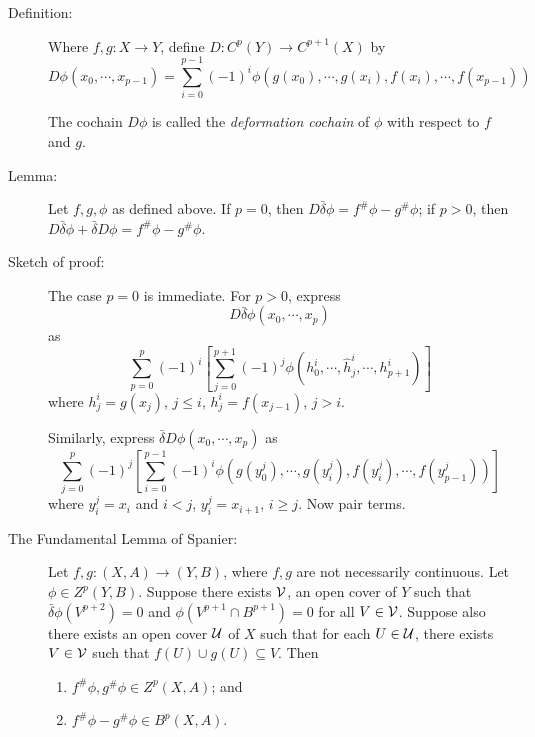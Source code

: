 \documentclass{article}
\begin{document}
\begin{description}
\item[Definition:] Where $f,g: X \longrightarrow Y$, define $D: C^p(Y) \longrightarrow C^{p+1}(X)$ by
  \begin{equation*}
  D \phi (x_0,\cdots,x_{p-1}) = \sum_{i=0}^{p-1} (-1)^i \phi ( g(x_0),\cdots,g(x_i),f(x_i),\cdots,f(x_{p-1}))
  \end{equation*}

  The cochain $D\phi$ is called the \emph{deformation cochain} of $\phi$ with respect to $f$ and $g$.

\item[Lemma:] Let $f,g,\phi$ as defined above. If $p=0$, then $D \bar{\delta} \phi = f^{\#} \phi - g^{\#} \phi$; if $p>0$, then $D \bar{\delta} \phi + \bar{\delta} D \phi = f^{\#} \phi - g^{\#} \phi$.

\item[Sketch of proof:] The case $p=0$ is immediate. For $p>0$, express 
  \begin{equation*}
  D \bar{\delta} \phi(x_0,\cdots,x_p)
  \end{equation*}
  as
  \begin{equation*}
  \sum_{p=0}^p(-1)^i \left[ \sum_{j=0}^{p+1}(-1)^j \phi (h_0^i,\cdots,\hat{h}_j^i,\cdots,h_{p+1}^i) \right]
  \end{equation*}
  where $h_j^i= g(x_j)$, $j \leq i$, $h_j^i=f(x_{j-1})$, $j>i$. 

  Similarly, express $\bar{\delta} D\phi (x_0,\cdots,x_p)$ as
  \begin{equation*}
  \sum_{j=0}^p(-1)^j \left[ \sum_{i=0}^{p-1}(-1)^i \phi (g(y_0^j),\cdots,g(y_i^j),f(y_i^j),\cdots,f(y_{p-1}^j)) \right]
  \end{equation*}
  where $y_i^j=x_i$ and $i<j$, $y_i^j=x_{i+1}$, $i \geq j$. Now pair terms.

\item[The Fundamental Lemma of Spanier:] Let $f,g: (X,A) \longrightarrow (Y,B)$, where $f,g$ are not necessarily continuous. Let $\phi \in Z^p(Y,B)$. Suppose there exists ${\cal V}$, an open cover of $Y$ such that $\bar{\delta} \phi (V^{p+2}) = 0$ and $\phi(V^{p+1} \cap B^{p+1}) = 0$ for all $V \in {\cal V}$. Suppose also there exists an open cover ${\cal U}$ of $X$ such that for each $U \in {\cal U}$, there exists $V \in {\cal V}$ such that $f(U) \cup g(U) \subseteq V$. Then 
  \begin{enumerate}[\hspace{1cm}(1)]
    \item $f^{\#}\phi, g^{\#}\phi \in Z^p(X,A)$; and 
    \item $f^{\#}\phi - g^{\#}\phi \in B^p(X,A)$.
  \end{enumerate}


\end{description}
\end{document}

